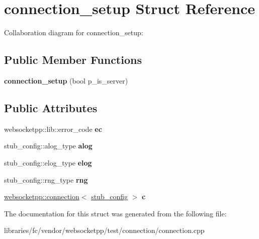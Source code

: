 \hypertarget{structconnection__setup}{}\section{connection\+\_\+setup Struct Reference}
\label{structconnection__setup}


Collaboration diagram for connection\+\_\+setup\+:
\subsection*{Public Member Functions}
\begin{DoxyCompactItemize}
\item 
\mbox{\label{structconnection__setup_a869b472c8f382978952f7464691bcdf6}} 
{\bfseries connection\+\_\+setup} (bool p\+\_\+is\+\_\+server)
\end{DoxyCompactItemize}
\subsection*{Public Attributes}
\begin{DoxyCompactItemize}
\item 
\mbox{\label{structconnection__setup_a346ad11f02d53d19e43341421129bd9e}} 
websocketpp\+::lib\+::error\+\_\+code {\bfseries ec}
\item 
\mbox{\label{structconnection__setup_a6c38f74ec4808c75e3e94c4fa383009b}} 
stub\+\_\+config\+::alog\+\_\+type {\bfseries alog}
\item 
\mbox{\label{structconnection__setup_a8405b9be773a039b02a82b65b7bd315e}} 
stub\+\_\+config\+::elog\+\_\+type {\bfseries elog}
\item 
\mbox{\label{structconnection__setup_afa3788b834ae30107318cc3e1d188c6d}} 
stub\+\_\+config\+::rng\+\_\+type {\bfseries rng}
\item 
\mbox{\label{structconnection__setup_a98b4b5701160021ac9151a7af145a940}} 
\mbox{\hyperlink{classwebsocketpp_1_1connection}{websocketpp\+::connection}}$<$ \mbox{\hyperlink{structstub__config}{stub\+\_\+config}} $>$ {\bfseries c}
\end{DoxyCompactItemize}


The documentation for this struct was generated from the following file\+:\begin{DoxyCompactItemize}
\item 
libraries/fc/vendor/websocketpp/test/connection/connection.\+cpp\end{DoxyCompactItemize}
